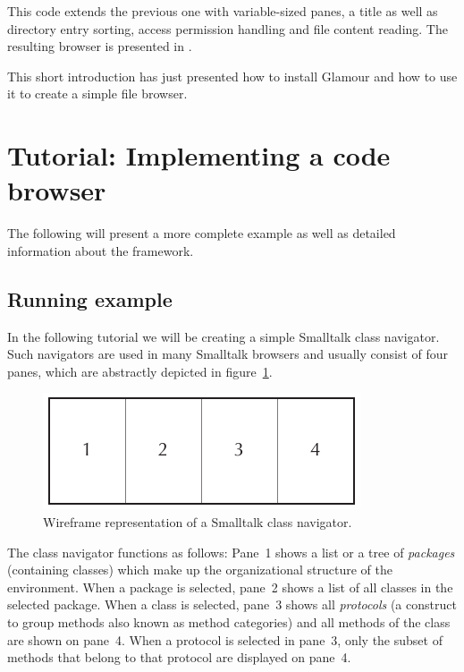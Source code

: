 \documentclass[a4paper,10pt,twoside]{book}
\begin{document}
This code extends the previous one with variable-sized panes, a title
as well as directory entry sorting, access permission handling and
file content reading. The resulting browser is presented in
.

This short
introduction has just presented how to install Glamour and how to use
it to create a simple file browser. 

\section{Tutorial: Implementing a code browser}

The following will present a more complete example as well as detailed
information about the framework.

\subsection{Running example}
\label{sec:tutorial/getting_started}

In the following tutorial we will be creating a simple Smalltalk class
navigator. Such navigators are used in many Smalltalk browsers and
usually consist of four panes, which are abstractly depicted in
figure~\ref{fig:classnavigator_wireframe}.

\begin{figure}[htbp]
\centerline{\includegraphics[width=\linewidth]{classnavigator_wireframe.pdf}}
\caption{Wireframe representation of a Smalltalk class navigator.}
\label{fig:classnavigator_wireframe}
\end{figure}

The class navigator functions as follows: Pane~1 shows a list or a
tree of \emph{packages} (containing classes) which make up the
organizational structure of the environment. When a package is
selected, pane~2 shows a list of all classes in the selected
package. When a class is selected, pane~3 shows all \emph{protocols}
(a construct to group methods also known as method categories) and all
methods of the class are shown on pane~4. When a protocol is
selected in pane~3, only the subset of methods that belong to that
protocol are displayed on pane~4.
\end{document}
